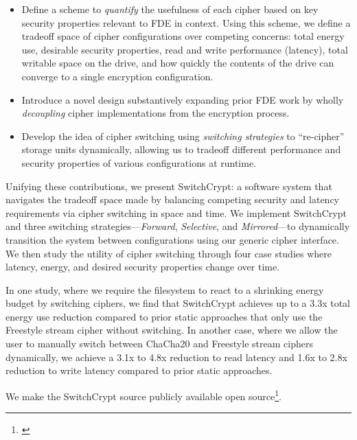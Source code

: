 \begin{itemize}
  \item Define a scheme to \emph{quantify} the usefulness of each cipher based
  on key security properties relevant to FDE in context. Using this scheme, we
  define a tradeoff space of cipher configurations over competing concerns:
  total energy use, desirable security properties, read and write performance
  (latency), total writable space on the drive, and how quickly the contents of
  the drive can converge to a single encryption configuration.

  \item Introduce a novel design substantively expanding prior FDE work by
  wholly \emph{decoupling} cipher implementations from the encryption process.

  \item Develop the idea of cipher switching using \emph{switching strategies}
  to ``re-cipher'' storage units dynamically, allowing us to tradeoff different
  performance and security properties of various configurations at runtime.
\end{itemize}

Unifying these contributions, we present SwitchCrypt: a software system that
navigates the tradeoff space made by balancing competing security and latency
requirements via cipher switching in space and time. We implement SwitchCrypt
and three switching strategies---\emph{Forward}, \emph{Selective}, and
\emph{Mirrored}---to dynamically transition the system between configurations
using our generic cipher interface. We then study the utility of cipher
switching through four case studies where latency, energy, and desired security
properties change over time.

In one study, where we require the filesystem to react to a shrinking energy
budget by switching ciphers, we find that SwitchCrypt achieves up to a 3.3x
total energy use reduction compared to prior static approaches that only use the
Freestyle stream cipher without switching. In another case, where we allow the
user to manually switch between ChaCha20 and Freestyle stream ciphers
dynamically, we achieve a 3.1x to 4.8x reduction to read latency and 1.6x to
2.8x reduction to write latency compared to prior static approaches.

We make the SwitchCrypt source publicly available open
source\footnote{\label{note1}\SystemURI}.
